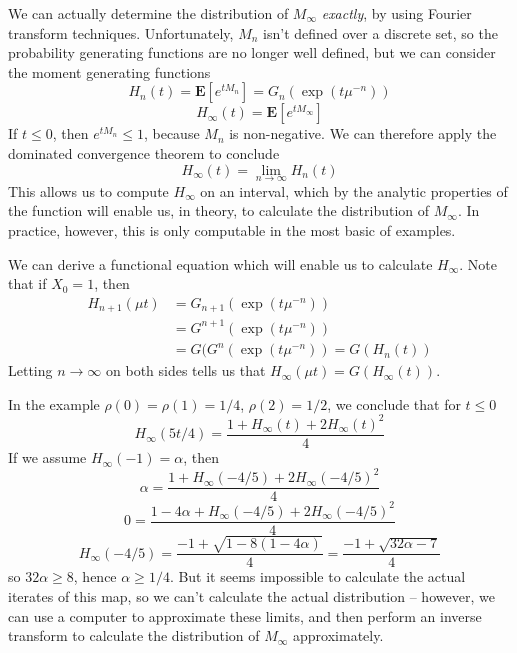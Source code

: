 We can actually determine the distribution of $M_\infty$ {\it exactly}, by using Fourier transform techniques. Unfortunately, $M_n$ isn't defined over a discrete set, so the probability generating functions are no longer well defined, but we can consider the moment generating functions
%
\[ H_n(t) = \mathbf{E}[e^{tM_n}] = G_n(\exp(t \mu^{-n})) \]
\[ H_\infty(t) = \mathbf{E}[e^{tM_\infty}] \]
%
If $t \leq 0$, then $e^{tM_n} \leq 1$, because $M_n$ is non-negative. We can therefore apply the dominated convergence theorem to conclude
%
\[ H_\infty(t) = \lim_{n \to \infty} H_n(t) \]
%
This allows us to compute $H_\infty$ on an interval, which by the analytic properties of the function will enable us, in theory, to calculate the distribution of $M_\infty$. In practice, however, this is only computable in the most basic of examples.

We can derive a functional equation which will enable us to calculate $H_\infty$. Note that if $X_0 = 1$, then
%
\begin{align*}
    H_{n+1}(\mu t) &= G_{n+1}(\exp(t \mu^{-n}))\\
    &= G^{n+1}(\exp(t \mu^{-n}))\\
    &= G(G^n(\exp(t \mu^{-n})) = G(H_n(t))
\end{align*}
%
Letting $n \to \infty$ on both sides tells us that $H_\infty(\mu t) = G(H_\infty(t))$.

\begin{example}
    In the example $\rho(0) = \rho(1) = 1/4$, $\rho(2) = 1/2$, we conclude that for $t \leq 0$
    \[ H_\infty(5t/4) = \frac{1 + H_\infty(t) + 2 H_\infty(t)^2}{4} \]
    If we assume $H_\infty(-1) = \alpha$, then
    \[ \alpha = \frac{1 + H_\infty(-4/5) + 2H_\infty(-4/5)^2}{4} \]
    \[ 0 = \frac{1 - 4\alpha + H_\infty(-4/5) + 2H_\infty(-4/5)^2}{4} \]
    \[ H_\infty(-4/5) = \frac{-1 + \sqrt{1 - 8(1 - 4\alpha)}}{4} = \frac{-1 + \sqrt{32\alpha - 7}}{4} \]
    so $32\alpha \geq 8$, hence $\alpha \geq 1/4$. But it seems impossible to calculate the actual iterates of this map, so we can't calculate the actual distribution -- however, we can use a computer to approximate these limits, and then perform an inverse transform to calculate the distribution of $M_\infty$ approximately.
\end{example}

